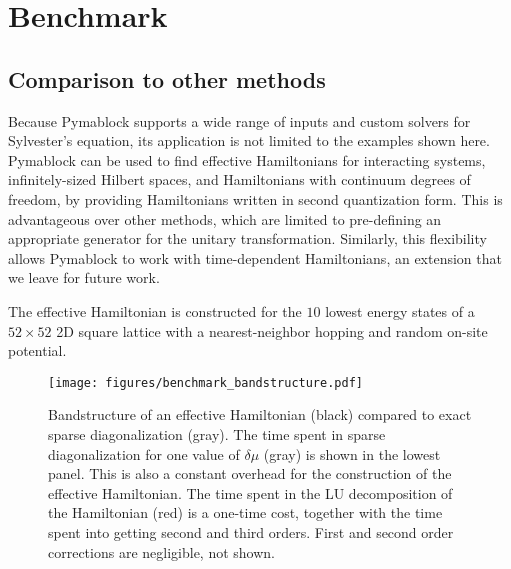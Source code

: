 \section{Benchmark}

\subsection{Comparison to other methods}

Because Pymablock supports a wide range of inputs and custom solvers for
Sylvester's equation, its application is not limited to the examples shown
here.
Pymablock can be used to find effective Hamiltonians for interacting systems,
infinitely-sized Hilbert spaces, and Hamiltonians with continuum degrees of
freedom, by providing Hamiltonians written in second quantization form.
This is advantageous over other methods, which are limited to pre-defining
an appropriate generator for the unitary transformation.
Similarly, this flexibility allows Pymablock to work with time-dependent
Hamiltonians, an extension that we leave for future work.




The effective Hamiltonian is constructed for the $10$ lowest energy
states of a $52 \times 52$ 2D square lattice with a nearest-neighbor
hopping and random on-site potential.
\begin{figure}[h]
    \centering
    \texttt{[image: figures/benchmark\_bandstructure.pdf]}
    \caption{
        Bandstructure of an effective Hamiltonian (black) compared to exact
        sparse diagonalization (gray).
        The time spent in sparse diagonalization for one value of $\delta \mu$
        (gray) is shown in the lowest panel.
        This is also a constant overhead for the construction of the effective
        Hamiltonian.
        The time spent in the LU decomposition of the Hamiltonian (red) is a
        one-time cost, together with the time spent into getting second
        and third orders.
        First and second order corrections are negligible, not shown.
        }
    \label{fig:benchmark_bandstructure}
\end{figure}

\co{}

